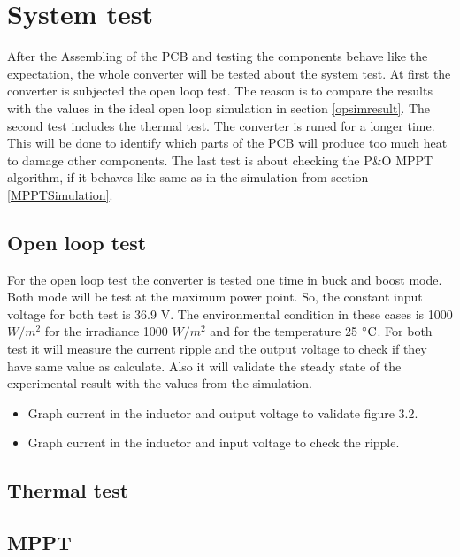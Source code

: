 \section{System test}
After the Assembling of the PCB and testing the components behave like the expectation, the whole converter will be tested about the system test. At first the converter is subjected the open loop test. The reason is to compare the results with the values in the ideal open loop simulation in section \ref{opsimresult}. The second test includes the thermal test. The converter is runed for a longer time. This will be done to identify which parts of the PCB will produce too much heat to damage other components. The last test is about checking the P\&O MPPT algorithm, if it behaves like same as in the simulation from section \ref{MPPTSimulation}.

\subsection{Open loop test}
For the open loop test the converter is tested one time in buck and boost mode. Both mode will be test at the maximum power point. So, the constant input voltage for both test is 36.9 V. The environmental condition in these cases is 1000 $W /m^2$ for the irradiance 1000 $W /m^2$ and for the temperature 25 $\decC$. For both test it will measure the current ripple and the output voltage to check if they have same value as calculate. Also it will validate the steady state of the experimental result with the values from the simulation.

\begin{itemize}
	\item Graph current in the inductor and output voltage to validate figure 3.2. 
	\item Graph current in the inductor and input voltage to check the ripple. 
\end{itemize}

\subsection{Thermal test}

\subsection{MPPT}

